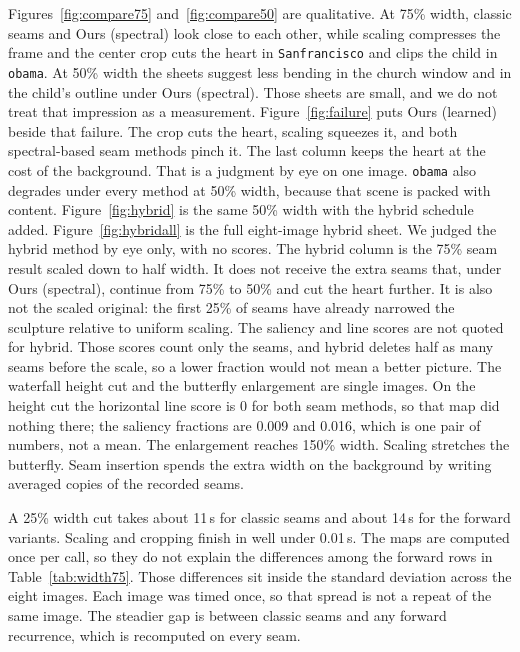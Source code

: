 \documentclass[10pt,twocolumn,letterpaper]{article}
\begin{document}
Figures~\ref{fig:compare75} and~\ref{fig:compare50} are qualitative.
At 75\% width, classic seams and Ours (spectral) look close to each other, while scaling compresses the frame and the center crop cuts the heart in \texttt{Sanfrancisco} and clips the child in \texttt{obama}.
At 50\% width the sheets suggest less bending in the church window and in the child's outline under Ours (spectral).
Those sheets are small, and we do not treat that impression as a measurement.
Figure~\ref{fig:failure} puts Ours (learned) beside that failure.
The crop cuts the heart, scaling squeezes it, and both spectral-based seam methods pinch it.
The last column keeps the heart at the cost of the background.
That is a judgment by eye on one image.
\texttt{obama} also degrades under every method at 50\% width, because that scene is packed with content.
Figure~\ref{fig:hybrid} is the same 50\% width with the hybrid schedule added.
Figure~\ref{fig:hybridall} is the full eight-image hybrid sheet.
We judged the hybrid method by eye only, with no scores.
The hybrid column is the 75\% seam result scaled down to half width.
It does not receive the extra seams that, under Ours (spectral), continue from 75\% to 50\% and cut the heart further.
It is also not the scaled original: the first 25\% of seams have already narrowed the sculpture relative to uniform scaling.
The saliency and line scores are not quoted for hybrid.
Those scores count only the seams, and hybrid deletes half as many seams before the scale, so a lower fraction would not mean a better picture.
The waterfall height cut and the butterfly enlargement are single images.
On the height cut the horizontal line score is 0 for both seam methods, so that map did nothing there; the saliency fractions are 0.009 and 0.016, which is one pair of numbers, not a mean.
The enlargement reaches 150\% width.
Scaling stretches the butterfly.
Seam insertion spends the extra width on the background by writing averaged copies of the recorded seams.

A 25\% width cut takes about 11\,s for classic seams and about 14\,s for the forward variants.
Scaling and cropping finish in well under 0.01\,s.
The maps are computed once per call, so they do not explain the differences among the forward rows in Table~\ref{tab:width75}.
Those differences sit inside the standard deviation across the eight images. Each image was timed once, so that spread is not a repeat of the same image.
The steadier gap is between classic seams and any forward recurrence, which is recomputed on every seam.
\end{document}
